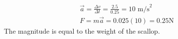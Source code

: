 \begin{multicols*}{2}
        \begin{mdframed}
            \begin{equation*}
                \begin{gathered}
                    \vec{a} = \frac{\Delta v}{\Delta t} = \frac{2.5}{0.25} = 10 \text{ m/s}^2   \\
                    F = m\vec{a} = 0.025(10) = \boxed{0.25\mathrm{N}}  
                \end{gathered}
            \end{equation*}
            The magnitude is equal to the weight of the scallop.
        \end{mdframed}
    \end{multicols*}
